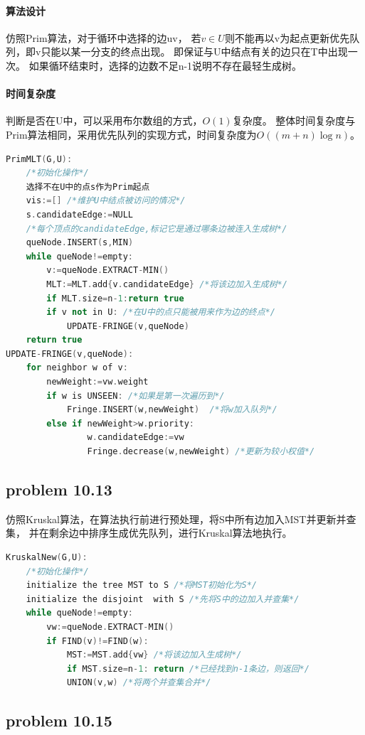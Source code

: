 \documentclass[11pt,a4paper,oneside,oldfontcommands]{ctexart}
\begin{document}
\paragraph*{算法设计}
仿照Prim算法，对于循环中选择的边uv，
若$v\in U$则不能再以v为起点更新优先队列，即v只能以某一分支的终点出现。
即保证与U中结点有关的边只在T中出现一次。
如果循环结束时，选择的边数不足n-1说明不存在最轻生成树。
\paragraph*{时间复杂度}
判断是否在U中，可以采用布尔数组的方式，$O(1)$复杂度。
整体时间复杂度与Prim算法相同，采用优先队列的实现方式，时间复杂度为$O((m+n)\log n)$。
\begin{lstlisting}[language=C++,title=PrimMLT.func]
PrimMLT(G,U):
	/*初始化操作*/
	选择不在U中的点s作为Prim起点
	vis:=[] /*维护U中结点被访问的情况*/
	s.candidateEdge:=NULL
	/*每个顶点的candidateEdge,标记它是通过哪条边被连入生成树*/
	queNode.INSERT(s,MIN)
	while queNode!=empty:
		v:=queNode.EXTRACT-MIN()
		MLT:=MLT.add{v.candidateEdge} /*将该边加入生成树*/
		if MLT.size=n-1:return true
		if v not in U: /*在U中的点只能被用来作为边的终点*/
			UPDATE-FRINGE(v,queNode)
	return true
UPDATE-FRINGE(v,queNode):
	for neighbor w of v:
		newWeight:=vw.weight
		if w is UNSEEN: /*如果是第一次遍历到*/
			Fringe.INSERT(w,newWeight)  /*将w加入队列*/
		else if newWeight>w.priority:
				w.candidateEdge:=vw
				Fringe.decrease(w,newWeight) /*更新为较小权值*/
\end{lstlisting}
\newpage
{\subsection*{problem 10.13}}
仿照Kruskal算法，在算法执行前进行预处理，将S中所有边加入MST并更新并查集，
并在剩余边中排序生成优先队列，进行Kruskal算法地执行。
\begin{lstlisting}[language=C++,title=KruskalNew.func]
KruskalNew(G,U):
	/*初始化操作*/
	initialize the tree MST to S /*将MST初始化为S*/
	initialize the disjoint  with S /*先将S中的边加入并查集*/
	while queNode!=empty:
		vw:=queNode.EXTRACT-MIN()
		if FIND(v)!=FIND(w):
			MST:=MST.add{vw} /*将该边加入生成树*/
			if MST.size=n-1: return /*已经找到n-1条边，则返回*/
			UNION(v,w) /*将两个并查集合并*/
\end{lstlisting}
{\subsection*{problem 10.15}}
\end{document}
